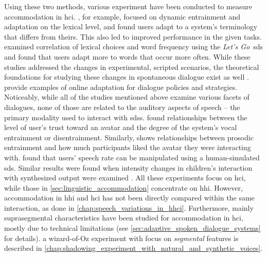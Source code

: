 Using these two methods, various experiment have been conducted to measure accommodation in \ac{hci}.
\citet{Bergqvist2020nontrivial, Lopes2011primes}, for example, focused on dynamic entrainment and adaptation on the lexical level, and found users adapt to a system's terminology that differs from theirs.
This also led to improved performance in the given tasks.
\citet{Parent2010lexical} examined correlation of lexical choices and word frequency using the \emph{Let's Go}~\ac{sds} \citep{Raux2005letsgo} and found that users adapt more to words that occur more often.
While these studies addressed the changes in experimental, scripted scenarios, the theoretical foundations for studying these changes in spontaneous dialogue exist as well \citep{Brennan1996lexical}.
\citet{Gasic2013policy, Levin2000stochastic} provide examples of online adaptation for dialogue policies and strategies.
Noticeably, while all of the studies mentioned above examine various facets of dialogues, none of those are related to the auditory aspects of speech -- the primary modality used to interact with \acp{sds}.
\citet{Benus2018prosodic} found relationships between the level of user's trust toward an avatar and the degree of the system's vocal entrainment or disentrainment.
Similarly, \citet[][pp.\ 142-144]{Levitan2014acoustic} shows relationships between prosodic entrainment and how much participants liked the avatar they were interacting with.
\citet{Bell2003prosodic} found that users' speech rate can be manipulated using a human-simulated \ac{sds}.
Similar results were found when intensity changes in children's interaction with synthesized output were examined \citep{Coulston2002amplitude}.
All these experiments focus on \ac{hci}, while those in \cref{sec:linguistic_accommodation} concentrate on \ac{hhi}.
However, accommodation in \ac{hhi} and \ac{hci} has not been directly compared within the same interaction, as done in \cref{chap:speech_variations_in_hhci}.
Furthermore, mainly suprasegmental characteristics have been studied for accommodation in \ac{hci}, mostly due to technical limitations (see \cref{sec:adaptive_spoken_dialogue_systems} for details).
a wizard-of-Oz experiment with focus on \emph{segmental} features is described in \cref{chap:shadowing_experiment_with_natural_and_synthetic_voices}.